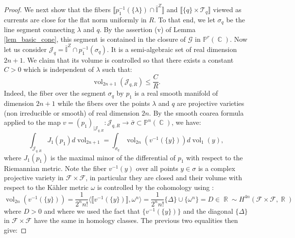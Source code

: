\documentclass[12pt]{amsbook}%
\theoremstyle{definition}
\theoremstyle{remark}
\numberwithin{section}{chapter}
\numberwithin{subsection}{section}
\numberwithin{figure}{chapter}
\DeclareMathOperator{\C}{\mathbb{C}}
\DeclareMathOperator{\vol}{vol}
\DeclareMathOperator{\R}{\mathbb{R}}
\newcommand\intcur[1]{\llbracket #1 \rrbracket}
\def\bP{{\mathbb{P}}}
\def\cF{{\mathscr{F}}}
\begin{document}
{{\begin{proof}
 We next show that 
 the fibers $\intcur{p_1^{-1}(\{\lambda\}) \cap \bar{\mathbb{I}}^Z }$ and $\intcur{\{q\}\times \mathcal{T}_q}$ viewed as currents are close for the flat norm uniformly in $R$.  To that end, we let $\sigma_q$ be the line segment connecting $\lambda$ and $q$. By the assertion (v) of Lemma \ref{lem_basic_cone}, this segment is contained in the closure of $\mathcal{G}$ in $\bP^r(\C)$. 
Now let us consider $
	\mathcal{J}_{q} = \bar{\mathbb{I}}^Z \cap p_1^{-1} (\sigma_q).
$
  It is a semi-algebraic set of real dimension $2n +1$. 
  We claim that its volume is controlled so that there exists a constant $C>0$ which is independent of $\lambda$ such that: 
  \begin{equation} \label{eq_control_volume_slice}
  	\vol_{2n+1}(\mathcal{J}_{q,R}) \leqslant \dfrac{C}{R}.   
  \end{equation}
  Indeed, the fiber over the segment $\sigma_q$ by $p_1$ is a real smooth manifold of dimension $2n+1$ while the fibers over the points $\lambda$ and $q$ are projective varieties (non irreducible or smooth) of real dimension $2n$. By the smooth coarea formula applied to the map $v = (p_1)_{| \mathcal{J}_{q,R}}\colon \mathcal{J}_{q,R} \to \bar \sigma \subset \bP^n(\C)$, we have: 
  \begin{equation*}
  \int_{\mathcal{J}_{q,R}} J_1(p_1) d\vol_{2n+1} = \int_{ \sigma_q} \vol_{2n}(v^{-1}(\{ y\})) d\vol_1(y), 
  \end{equation*}
  where $J_1(p_1)$ is the maximal minor of the differential of $p_1$ with respect to the Riemannian metric. 
   Note the fiber $v^{-1}(y)$ over all points $y \in \sigma$ is a complex projective variety in $\cF\times \cF$, in particular they are closed and their volume with respect to the K\"ahler metric $\omega$ is controlled by the cohomology using \cite[Equation 1.24]{demailly}: 
   \begin{equation*}
   \vol_{2n} ( v^{-1}(\{ y\})) = \dfrac{1}{2^{n} n!} \langle \intcur{v^{-1}(\{ y \})} , \omega^{n} \rangle = \dfrac{1}{2^{n} n!} \{ \Delta \} \cup \{ \omega^{n} \} = D \in \R \sim H^{4n}(\cF\times \cF, \R)   
   \end{equation*}
   where $D> 0$ and where we used the fact that $\{v^{-1}(\{ y\}) \}$ and the diagonal  $\{\Delta \}$ in $\cF\times \cF$ have the same in homology classes.    The previous two equalities then give: 

\end{proof}}}
\end{document}
